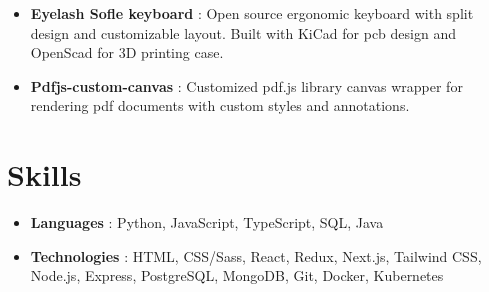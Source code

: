 \documentclass[letterpaper,11pt]{article}
\newif\ifrussian
\newcommand{\text}[2]{%
  \ifrussian#2\else#1\fi%
}
\newcommand{\resumeSubItem}[2]{
  \item\small{
    \textbf{#1}{: #2 \vspace{-2pt}}
  }
\vspace{-4pt}}
\newcommand{\resumeSubHeadingListStart}{\begin{itemize}[leftmargin=*]}
\newcommand{\resumeSubHeadingListEnd}{\end{itemize}}
\begin{document}
\resumeSubHeadingListStart
\resumeSubItem
{\text
  {Eyelash Sofle keyboard}
  {Eyelash Sofle keyboard}}
{\text
  {Open source ergonomic keyboard with split design and customizable layout. Built with KiCad for pcb design and OpenScad for 3D printing case.}
  {Открытый исходный код эргономичной сплит клавиатуры с настраиваемой раскладкой. Разработан с использованием KiCad для дизайна печатных плат и OpenScad для 3D-печати корпуса.}}
\resumeSubItem
{\text
  {Pdfjs-custom-canvas}
  {Pdfjs-custom-canvas}}
{\text
  {Customized pdf.js library canvas wrapper for rendering pdf documents with custom styles and annotations.}
  {Кастомизированная обертка canvas библиотеки pdf.js для рендеринга pdf-документов с пользовательскими стилями и аннотациями.}}
\resumeSubHeadingListEnd

\section
 {\text
  {Skills}
  {Навыки}}
\resumeSubHeadingListStart
\resumeSubItem
{\text
  {Languages}
  {Языки}}
{Python, JavaScript, TypeScript, SQL, Java}
\resumeSubItem
{\text
  {Technologies}
  {Технологии}}
{HTML, CSS/Sass, React, Redux, Next.js, Tailwind CSS, Node.js, Express, PostgreSQL, MongoDB, Git, Docker, Kubernetes}
\resumeSubHeadingListEnd
\end{document}
